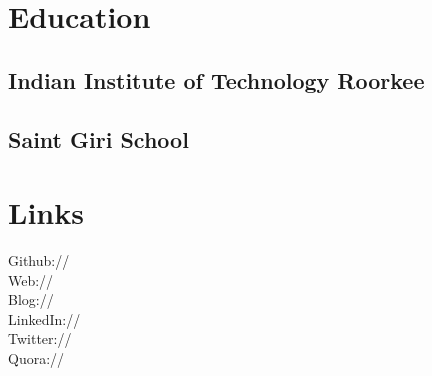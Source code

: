 \documentclass[]{deedy-resume-openfont}
\begin{document}
\begin{minipage}[t]{0.33\textwidth} 


\section{Education} 


\subsection{Indian Institute of Technology Roorkee}
\sectionsep


\subsection{Saint Giri School}
\sectionsep


\section{Links} 
Github:// \href{https://github.com/aktech}{} \\
Web:// \href{http://iamit.in/}{} \\
Blog:// \href{http://iamit.in/blog/}{} \\
LinkedIn://  \href{https://www.linkedin.com/in/iaktech}{} \\
Twitter://  \href{https://twitter.com/iaktech}{} \\
Quora://  \href{https://www.quora.com/Amit-Kumar-516}{}
\sectionsep


\end{minipage}
\end{document}

